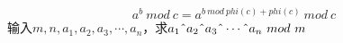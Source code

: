 $$a^b\ mod\ c=a^{b\ mod\ phi(c)+phi(c)}\ mod\ c$$
输入$m, n, a_1, a_2, a_3, \cdots, a_n$，求$a_1\string^a_2\string^a_3\string^\cdots\string^a_n\ mod\ m$

